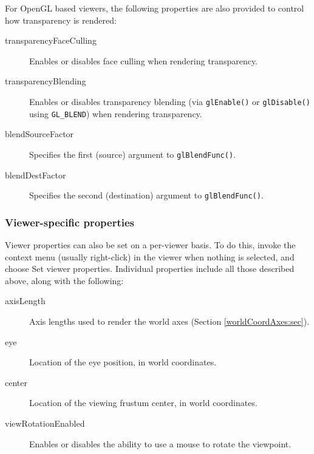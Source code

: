 \documentclass{article}
\begin{document}
For OpenGL based viewers, the following properties are also provided
to control how transparency is rendered:

\begin{description}

\item[transparencyFaceCulling]\mbox{}

Enables or disables face culling when rendering transparency.

\item[transparencyBlending]\mbox{}

Enables or disables transparency blending (via {\tt glEnable()} or
{\tt glDisable()} using {\tt GL\_BLEND}) when rendering transparency.

\item[blendSourceFactor]\mbox{}

Specifies the first (source) argument to {\tt glBlendFunc()}.

\item[blendDestFactor]\mbox{}

Specifies the second (destination) argument to {\tt glBlendFunc()}.

\end{description}

\subsubsection{Viewer-specific properties}
\label{ViewerSpecificProps:sec}

Viewer properties can also be set on a per-viewer basis. To do this,
invoke the context menu (usually right-click) in the viewer when
nothing is selected, and choose {\sf Set viewer properties}.
Individual properties include all those described above, along with
the following:

\begin{description}

\item[axisLength]\mbox{}

Axis lengths used to render the world axes (Section
\ref{worldCoordAxes:sec}).

\item[eye]\mbox{}

Location of the eye position, in world coordinates.

\item[center]\mbox{}

Location of the viewing frustum center, in world coordinates.

\item[viewRotationEnabled]\mbox{}

Enables or disables the ability to use a mouse to rotate the
viewpoint.

\end{description}
\end{document}
